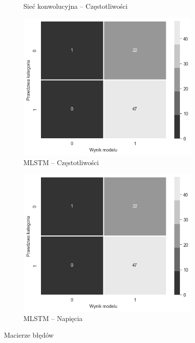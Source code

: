 \documentclass{./assets/wfis}
\begin{document}
\begin{figure}[h!]
\begin{subfigure}[b]{0.45\textwidth}
        \caption{Sieć konwolucyjna – Częstotliwości}
        \label{fig:psychoactive-substances}
    \end{subfigure}
    \begin{subfigure}[b]{0.45\textwidth}
        \centering
        \includegraphics[width=\columnwidth]{thesis/assets/confusion_matrix_placeholder.png}
        \caption{MLSTM – Częstotliwości}
        \label{fig:computer-time}
    \end{subfigure}   
    \hfill
    \begin{subfigure}[b]{0.45\textwidth}
        \centering
        \includegraphics[width=\columnwidth]{thesis/assets/confusion_matrix_placeholder.png}
        \caption{MLSTM – Napięcia}
        \label{fig:psychoactive-substances}
    \end{subfigure}
    \caption{Macierze błędów}
    \label{fig:confusion-matricies}
\end{figure}
\end{document}
